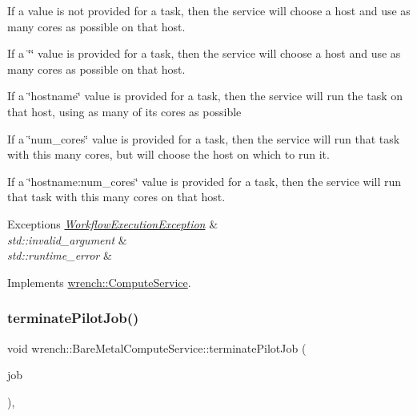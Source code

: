 \begin{DoxyItemize}
\item If a value is not provided for a task, then the service will choose a host and use as many cores as possible on that host.
\item If a \char`\"{}\char`\"{} value is provided for a task, then the service will choose a host and use as many cores as possible on that host.
\item If a \char`\"{}hostname\char`\"{} value is provided for a task, then the service will run the task on that host, using as many of its cores as possible
\item If a \char`\"{}num\+\_\+cores\char`\"{} value is provided for a task, then the service will run that task with this many cores, but will choose the host on which to run it.
\item If a \char`\"{}hostname\+:num\+\_\+cores\char`\"{} value is provided for a task, then the service will run that task with this many cores on that host.
\end{DoxyItemize}


\begin{DoxyExceptions}{Exceptions}
{\em \hyperlink{classwrench_1_1_workflow_execution_exception}{Workflow\+Execution\+Exception}} & \\
\hline
{\em std\+::invalid\+\_\+argument} & \\
\hline
{\em std\+::runtime\+\_\+error} & \\
\hline
\end{DoxyExceptions}


Implements \hyperlink{classwrench_1_1_compute_service}{wrench\+::\+Compute\+Service}.

\mbox{\label{classwrench_1_1_bare_metal_compute_service_ac57b38fba771cc65efc811abcf8907e2}} 
\subsubsection{\texorpdfstring{terminate\+Pilot\+Job()}{terminatePilotJob()}}
{\footnotesize\ttfamily void wrench\+::\+Bare\+Metal\+Compute\+Service\+::terminate\+Pilot\+Job (\begin{DoxyParamCaption}\item[{\hyperlink{classwrench_1_1_pilot_job}{Pilot\+Job} $\ast$}]{job }\end{DoxyParamCaption})\hspace{0.3cm}{\ttfamily [override]}, {\ttfamily [virtual]}}



